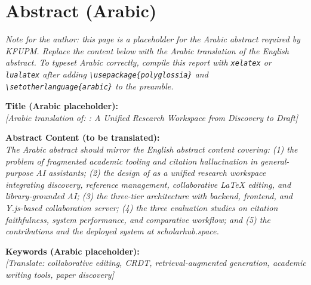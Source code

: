 \chapter*{Abstract (Arabic)}

\begin{center}
\textit{Note for the author: this page is a placeholder for the Arabic abstract required by KFUPM. Replace the content below with the Arabic translation of the English abstract. To typeset Arabic correctly, compile this report with \texttt{xelatex} or \texttt{lualatex} after adding \texttt{\textbackslash usepackage\{polyglossia\}} and \texttt{\textbackslash setotherlanguage\{arabic\}} to the preamble.}
\end{center}

\vspace{1cm}

\noindent\textbf{Title (Arabic placeholder):} \\
\textit{[Arabic translation of: \sh{}: A Unified Research Workspace from Discovery to Draft]}

\vspace{1cm}

\noindent\textbf{Abstract Content (to be translated):} \\
\textit{The Arabic abstract should mirror the English abstract content covering: (1) the problem of fragmented academic tooling and citation hallucination in general-purpose AI assistants; (2) the design of \sh{} as a unified research workspace integrating discovery, reference management, collaborative LaTeX editing, and library-grounded AI; (3) the three-tier architecture with backend, frontend, and Y.js-based collaboration server; (4) the three evaluation studies on citation faithfulness, system performance, and comparative workflow; and (5) the contributions and the deployed system at scholarhub.space.}

\vspace{1cm}

\noindent\textbf{Keywords (Arabic placeholder):} \\
\textit{[Translate: collaborative editing, CRDT, retrieval-augmented generation, academic writing tools, paper discovery]}

\clearpage
